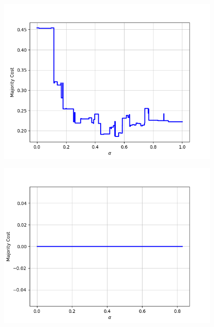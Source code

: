 \begin{figure}[h]
\begin{minipage}{.24\textwidth}
  \centering
  {\includegraphics[width=\linewidth]{plots/nell-ac/attraction}}
\end{minipage}
\begin{minipage}{.24\textwidth}
  \centering
  {\includegraphics[width=\linewidth]{plots/nell-ac/beverage}}
\end{minipage}
\begin{minipage}{.24\textwidth}
  \centering

\end{minipage}
\end{figure}
